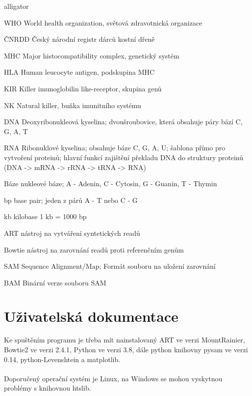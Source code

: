 \documentclass[czech,DP]{thesiskiv}
\numberwithin{equation}{section}
\begin{document}
\begin{labeling}{alligator}
	\item [WHO] World health organization, světová zdravotnická organizace
	\item [ČNRDD] Český národní registr dárců kostní dřeně
	\item [MHC] Major histocompatibility complex, genetický systém	
	\item [HLA] Human leucocyte antigen, podskupina MHC
	\item [KIR] Killer imunoglobilin like-receptor, skupina genů
	\item [NK] Natural killer, buňka imunitního systému
	\item [DNA] Deoxyribonukleová kyselina; dvoušroubovice, která obsahuje páry bází C, G, A, T 
	\item [RNA] Ribonuklové kyselina; obsahuje báze C, G, A, U; šablona přímo pro vytvoření proteinů; hlavní funkcí zajištění překladu DNA do struktury proteinů (DNA -> mRNA -> rRNA -> tRNA -> RNA) 
	\item [Báze] nukleové báze; A - Adenin, C - Cytosin, G - Guanin, T - Thymin
	\item [bp] base pair; jeden z párů A - T nebo C - G
	\item [kb] kilobase 1 kb = 1000 bp
	\item [ART] nástroj na vytváření syntetických readů
	\item [Bowtie] nástroj na zarovnání readů proti referenčním genům
	\item [SAM] Sequence Alignment/Map; Formát souboru na uložení zarovnání
	\item [BAM] Binární verze souboru SAM
\end{labeling}


% 
%
\nocite{*}

{\raggedright\small

}


\appendix
\chapter{Uživatelská dokumentace}
Ke spuštěním programu je třeba mít nainstalovaný ART ve verzi MountRainier, Bowtie2 ve verzi 2.4.1, Python ve verzi 3.8, dále python knihovny pysam ve verzi 0.14, python-Levenshtein a matplotlib.
\\
\\
Doporučený operační systém je Linux, na Windows se mohou vyskytnou problémy s knihovnou htslib. 
\end{document}

